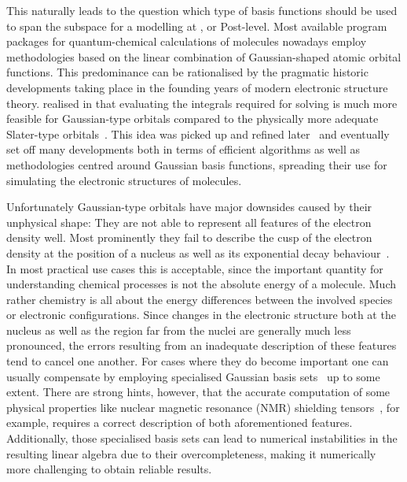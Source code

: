 This naturally leads to the question
which type of basis functions should be used to span the subspace
for a modelling at \HF, \DFT or Post-\HF level.
Most available program packages for
quantum-chemical calculations of molecules nowadays employ methodologies based on
the linear combination of Gaussian-shaped atomic orbital functions.
This predominance can be rationalised
by the pragmatic historic developments
taking place in the founding years of modern electronic structure theory.
\citet{Boys1950} realised in \citeyear{Boys1950}
that evaluating the integrals
required for solving \HF is much more feasible for Gaussian-type orbitals
compared to the physically more adequate Slater-type orbitals~\cite{Slater1930}.
This idea was picked up and refined later~\cite{Hehre1969}
and eventually set off many developments
both in terms of efficient algorithms as well as methodologies
centred around Gaussian basis functions,
spreading their use for simulating the electronic structures of molecules.

Unfortunately Gaussian-type orbitals have major downsides
caused by their unphysical shape:
They are not able to represent
all features of the electron density well.
Most prominently they fail to describe the cusp of the electron density
at the position of a nucleus as well as its exponential decay behaviour~\cite{Kato1957}.
In most practical use cases this is acceptable,
since the important quantity for understanding chemical processes
is not the absolute energy of a molecule.
Much rather chemistry is all about the energy differences
between the involved species or electronic configurations.
Since changes in the electronic structure both at the nucleus as well as
the region far from the nuclei are generally much less pronounced,
the errors resulting from an inadequate description
of these features tend to cancel one another.
For cases where they do become important
one can usually compensate by employing specialised Gaussian
basis sets~\cite{Jensen2013,Hill2013} up to some extent.
There are strong hints, however,
that the accurate computation of some physical properties
like nuclear magnetic resonance (NMR) shielding tensors~\cite{Guell2008,Hoggan2009},
for example,
requires a correct description of both aforementioned features.
Additionally, those specialised basis sets can lead to
numerical instabilities in the resulting linear algebra due to their overcompleteness,
making it numerically more challenging to obtain reliable results.

